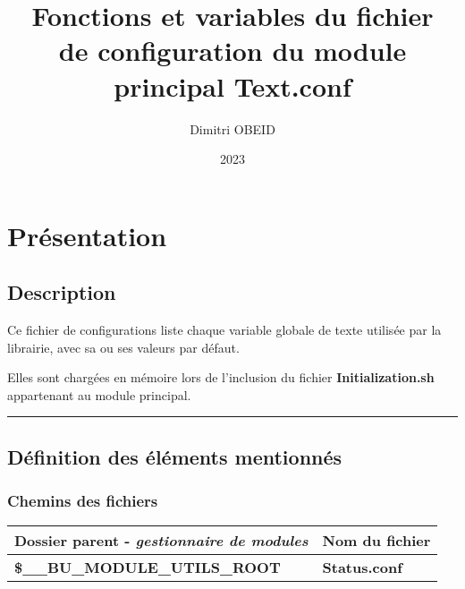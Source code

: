 \documentclass[a4paper,10pt]{article}
\title{\color{sec1}Fonctions et variables du fichier \\de configuration du module \\principal \color{path}Text.conf}\color{text}
\author{Dimitri OBEID}
\date{2023}
\begin{document}
    \maketitle
    \newpage

    \hypertarget{contents}{}
    \tableofcontents
    \newpage

    \color{sec1}
    \section{Présentation}\color{text}

    \color{sec2}
    \subsection{Description}\color{text}

    \begin{justify}
        Ce fichier de configurations liste chaque variable globale de texte utilisée par la librairie, avec sa ou ses valeurs par défaut.
    \end{justify}

    \begin{justify}
        Elles sont chargées en mémoire lors de l'inclusion du fichier \textbf{\color{path}Initialization.sh} appartenant au module principal.
    \end{justify}



    \color{sec2}\par\noindent\rule{\textwidth}{0.4pt}\color{text}

    \color{sec2}
    \subsection{Définition des éléments mentionnés}\color{text}

    \color{sec3}
    \subsubsection{Chemins des fichiers}\color{text}

    \begin{justify}
        \begin{tabular}{|l|l|}
            \hline
            \textbf{Dossier parent} - \textit{gestionnaire de modules} & \textbf{Nom du fichier}\\
            \hline
            \textbf{\color{vars}\$\_\_BU\_MODULE\_UTILS\_ROOT} & \textbf{\color{path}Status.conf}\\
            \hline
        \end{tabular}
    \end{justify}
\end{document}
